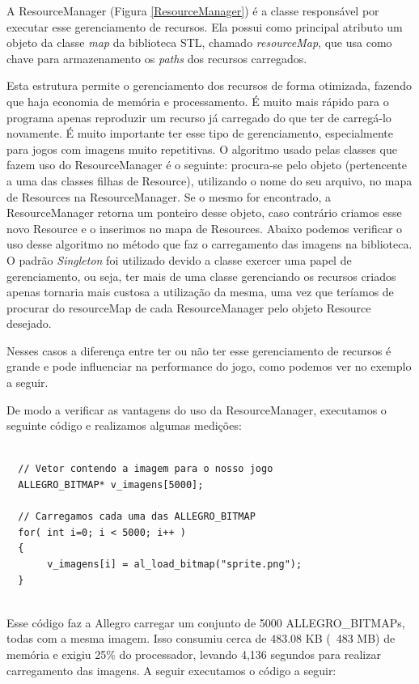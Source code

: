 %
%
\par 
A ResourceManager (Figura \ref{ResourceManager}) é a classe responsável por executar esse gerenciamento de recursos. Ela possui como principal atributo um objeto da classe \textit{map} da biblioteca STL, chamado \textit{resourceMap}, que usa como chave para armazenamento os \textit{paths} dos recursos carregados.

Esta estrutura permite o gerenciamento dos recursos de forma otimizada, fazendo que haja economia de memória e processamento. É muito mais rápido para o programa apenas reproduzir um recurso já carregado do que ter de carregá-lo novamente. É muito importante ter esse tipo de gerenciamento, especialmente para jogos com imagens muito repetitivas. O algoritmo usado pelas classes que fazem uso do ResourceManager é o seguinte: procura-se pelo objeto (pertencente a uma das classes filhas de Resource), utilizando o nome do seu arquivo, no mapa de Resources na ResourceManager. Se o mesmo for encontrado, a ResourceManager retorna um ponteiro desse objeto, caso contrário criamos esse novo Resource e o inserimos no mapa de Resources. Abaixo podemos verificar o uso desse algoritmo no método que faz o carregamento das imagens na biblioteca. O padrão \textit{Singleton} foi utilizado devido a classe exercer uma papel de gerenciamento, ou seja, ter mais de uma classe gerenciando os recursos criados apenas tornaria mais custosa a utilização da mesma, uma vez que teríamos de procurar do resourceMap de cada ResourceManager pelo objeto Resource desejado.
%

%
\par 
Nesses casos a diferença entre ter ou não ter esse gerenciamento de recursos é grande e pode influenciar na performance do jogo, como podemos ver no exemplo a seguir.
\par 
De modo a verificar as vantagens do uso da ResourceManager, executamos o seguinte código e realizamos algumas medições: 
%
%
\begin{lstlisting}

  // Vetor contendo a imagem para o nosso jogo
  ALLEGRO_BITMAP* v_imagens[5000];
      
  // Carregamos cada uma das ALLEGRO_BITMAP
  for( int i=0; i < 5000; i++ )
  {
       v_imagens[i] = al_load_bitmap("sprite.png");
  }
  
\end{lstlisting}
%
\par
Esse código faz a Allegro carregar um conjunto de 5000 ALLEGRO\_BITMAPs, todas com a mesma imagem. Isso consumiu cerca de 483.08 KB (~483 MB) de memória e exigiu 25\% do processador, levando 4,136 segundos para realizar carregamento das imagens. A seguir executamos o código a seguir:
